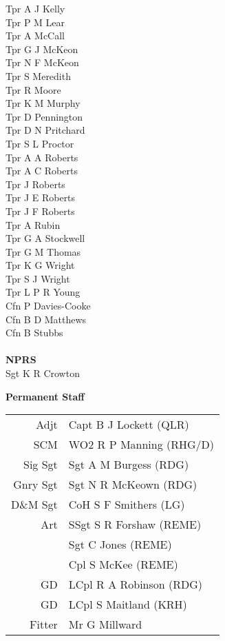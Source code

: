 \begin{multicols}{3}
  Tpr A J Kelly \\
  Tpr P M Lear \\
  Tpr A McCall \\
  Tpr G J McKeon \\
  Tpr N F McKeon \\
  Tpr S Meredith \\
  Tpr R Moore \\
  Tpr K M Murphy \\
  Tpr D Pennington \\
  Tpr D N Pritchard \\
  Tpr S L Proctor \\
  Tpr A A Roberts \\
  Tpr A C Roberts \\
  Tpr J Roberts \\
  Tpr J E Roberts \\
  Tpr J F Roberts \\
  Tpr A Rubin \\
  Tpr G A Stockwell \\
  Tpr G M Thomas \\
  Tpr K G Wright \\
  Tpr S J Wright \\
  Tpr L P R Young \\
  Cfn P Davies-Cooke \\
  Cfn B D Matthews \\
  Cfn B Stubbs \\
  \\
  \textbf{NPRS} \\
  Sgt K R Crowton \\
\end{multicols}

\vspace*{10mm}

\begin{center}
  \Large
  \textbf{Permanent Staff}
\end{center}

\begin{center}
  \begin{tabular}{rl}
    Adjt & Capt B J Lockett (QLR) \\
    SCM & WO2 R P Manning (RHG/D) \\
    Sig Sgt & Sgt A M Burgess (RDG) \\
    Gnry Sgt & Sgt N R McKeown (RDG) \\
    D\&M Sgt & CoH S F Smithers (LG) \\
    Art & SSgt S R Forshaw (REME) \\
    & Sgt C Jones (REME) \\
    & Cpl S McKee (REME) \\
    GD & LCpl R A Robinson (RDG) \\
    GD & LCpl S Maitland (KRH) \\
    Fitter & Mr G Millward \\
  \end{tabular}
\end{center}
